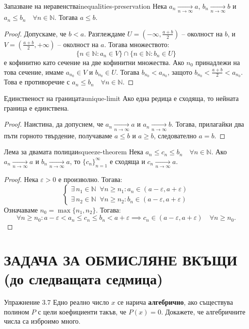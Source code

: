 \begin{theorem}{Запазване на неравенства}{inequalities-preservation}
Нека $a_n \xrightarrow[n\to\infty]{} a$, $b_n \xrightarrow[n\to\infty]{} b$ и $a_n \le b_n \quad \forall n \in \mathbb{N}$. Тогава $a \le b$.
\end{theorem}

\begin{proof}
Допускаме, че $b < a$. Разглеждаме $U = \left(-\infty, \frac{a+b}{2}\right)$ -- околност на $b$, и $V = \left(\frac{a+b}{2}, +\infty\right)$ -- околност на $a$. Тогава множеството:
\[
\{n \in \mathbb{N} : a_n \in V\} \cap \{n \in \mathbb{N} : b_n \in U\}
\]
е кофинитно като сечение на две кофинитни множества. Ако $n_0$ принадлежи на това сечение, имаме $a_{n_0} \in V$ и $b_{n_0} \in U$. Тогава $b_{n_0} < a_{n_0}$, защото $b_{n_0} < \frac{a+b}{2} < a_{n_0}$. Това е противоречие с $a_n \le b_n \quad \forall n \in \mathbb{N}$.
\end{proof}

\begin{corollary}{Единственост на границата}{unique-limit}
Ако една редица е сходяща, то нейната граница е единствена.
\end{corollary}

\begin{proof}
Наистина, да допуснем, че $a_n \xrightarrow[n\to\infty]{} a$ и $a_n \xrightarrow[n\to\infty]{} b$. Тогава, прилагайки два пъти горното твърдение, получаваме $a \le b$ и $a \ge b$, следователно $a = b$.
\end{proof}

\begin{lemma}{Лема за двамата полицаи}{squeeze-theorem}
Нека $a_n \le c_n \le b_n \quad \forall n \in \mathbb{N}$. Ако $a_n \xrightarrow[n\to\infty]{} a$ и $b_n \xrightarrow[n\to\infty]{} a$, то $\{c_n\}_{n=1}^\infty$ е сходяща и $c_n \xrightarrow[n\to\infty]{} a$.
\end{lemma}

\begin{proof}
Нека $\varepsilon > 0$ е произволно. Тогава:
\[
\begin{cases}
\exists\, n_1 \in \mathbb{N} \;\; \forall n \ge n_1 : a_n \in (a - \varepsilon, a + \varepsilon) \\
\exists\, n_2 \in \mathbb{N} \;\; \forall n \ge n_2 : b_n \in (a - \varepsilon, a + \varepsilon)
\end{cases}
\]
Означаваме $n_0 = \max \{n_1, n_2\}$. Тогава:
\[
\forall n \ge n_0 : a - \varepsilon < a_n \le c_n \le b_n < a + \varepsilon \implies c_n \in (a - \varepsilon, a + \varepsilon) \quad \forall n \ge n_0.
\]
\end{proof}

\section*{ЗАДАЧА ЗА ОБМИСЛЯНЕ ВКЪЩИ (до следващата седмица)}

\begin{problembox}{Упражнение 3.7}
Едно реално число $x$ се нарича \textbf{алгебрично}, ако съществува полином $P$ с цели коефициенти такъв, че $P(x) = 0$. Докажете, че алгебричните числа са изброимо много.
\end{problembox}